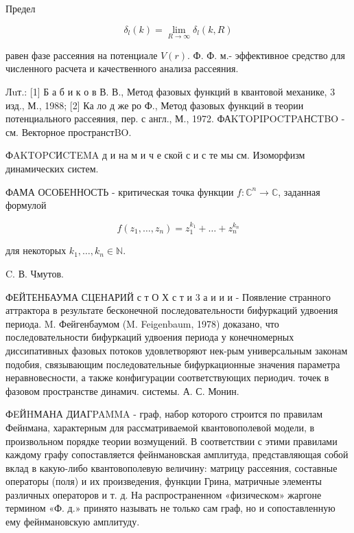 \documentclass[10pt]{article}
\begin{document}
Предел



\[

\delta_{l}(k)=\lim _{R \rightarrow \infty} \delta_{l}(k, R)

\]



равен фазе рассеяния на потенциале $V(r)$. Ф. Ф. м.- эффективное средство для численного расчета и качественного анализа рассеяния.



Лuт.: [1] Б а б и к о в В. В., Метод фазовых функций в квантовой механике, 3 изд., М., 1988; [2] Ка ло д же ро Ф., Метод фазовых функций в теории потенциального рассеяния, пер. с англ., М., 1972. ФАKTOPIPOCTPAНСTBO - см. Векторное пространстBO.



ФAKTOPCИCTEMA д и на м и ч е ской с и с те мы см. Изоморфизм динамических систем.



ФАМА ОСОБЕННОСТЬ - критическая точка функции $f: \mathbb{C}^{n} \rightarrow \mathbb{C}$, заданная формулой



\[

f\left(z_{1}, \ldots, z_{n}\right)=z_{1}^{k_{1}}+\ldots+z_{n}^{k_{n}}

\]



для некоторых $k_{1}, \ldots, k_{n} \in \mathbb{N}$.



C. В. Чмутов.



ФЕЙТЕНБАУМА СЦЕНАРИЙ с т О Х с т и 3 а и и и - Появление странного аттрактора в результате бесконечной последовательности бифуркаций удвоения периода. M. Фейгенбаумом (M. Feigenbaum, 1978) доказано, что последовательности бифуркаций удвоения периода у конечномерных диссипативных фазовых потоков удовлетворяют нек-рым универсальным законам подобия, связывающим последовательные бифуркационные значения параметра неравновесности, а также конфигурации соответствующих периодич. точек в фазовом пространстве динамич. системы. А. С. Монин.



ФEЙHМАНА ДИАГPAMMA - граф, набор которого строится по правилам Фейнмана, характерным для рассматриваемой квантовополевой модели, в произвольном порядке теории возмущений. В соответствии с этими правилами каждому графу сопоставляется фейнмановская амплитуда, представляющая собой вклад в какую-либо квантовополевую величину: матрицу рассеяния, составные операторы (поля) и их произведения, функции Грина, матричные элементы различных операторов и т. д. На распространенном «физическом» жаргоне термином «Ф. д.» принято называть не только сам граф, но и сопоставленную ему фейнмановскую амплитуду.
\end{document}
